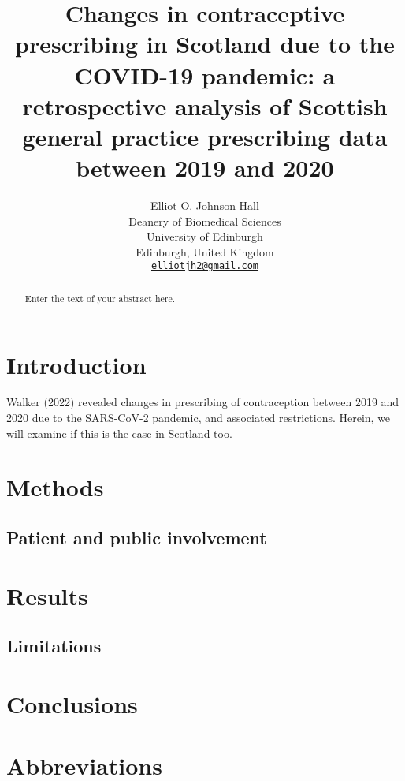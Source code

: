 \documentclass{article}
\title{Changes in contraceptive prescribing in Scotland due to the
COVID-19 pandemic: a retrospective analysis of Scottish general practice
prescribing data between 2019 and 2020}
\author{
    Elliot O. Johnson-Hall
   \\
    Deanery of Biomedical Sciences \\
    University of Edinburgh \\
  Edinburgh, United Kingdom \\
  \texttt{\href{mailto:elliotjh2@gmail.com}{\nolinkurl{elliotjh2@gmail.com}}} \\
  }
\begin{document}
\maketitle


\begin{abstract}
Enter the text of your abstract here.
\end{abstract}


\hypertarget{introduction}{%
\section{Introduction}\label{introduction}}

Walker (2022) revealed changes in prescribing of contraception between
2019 and 2020 due to the SARS-CoV-2 pandemic, and associated
restrictions. Herein, we will examine if this is the case in Scotland
too.

\hypertarget{methods}{%
\section{Methods}\label{methods}}

\hypertarget{patient-and-public-involvement}{%
\subsection{Patient and public
involvement}\label{patient-and-public-involvement}}

\hypertarget{results}{%
\section{Results}\label{results}}

\hypertarget{limitations}{%
\subsection{Limitations}\label{limitations}}

\hypertarget{conclusions}{%
\section{Conclusions}\label{conclusions}}

\hypertarget{abbreviations}{%
\section{Abbreviations}\label{abbreviations}}
\end{document}
